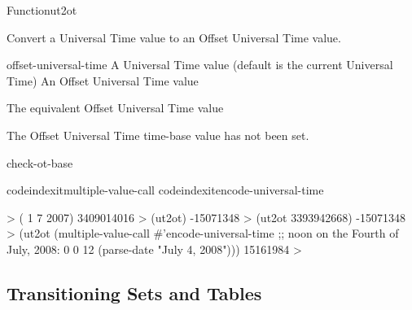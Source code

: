 \documentclass[10pt,twoside,english,pdftex]{article}
\begin{document}

\begin{functiondoc}{Function}{ut2ot}{%
    }
%

\fnsyntax

\fnpurpose Convert a Universal Time value to an Offset Universal Time 
value.

\fnpackage {}

\fnmodule {}

\fnargs
\begin{args}{offset-universal-time}
 A Universal Time value (default is the current
   Universal Time)
 An Offset Universal Time value
\end{args}

\fnreturns The equivalent Offset Universal Time value

\fnerrors The Offset Universal Time time-base value has not been set.

\begin{alsos}{check-ot-base}
\also[*ot-base*]
\also[ot2ut]
\end{alsos}

\fnexamples
%
codeindexit{multiple-value-call}%
codeindexit{encode-universal-time}%
%
\W\supp
\begin{example}
  > ( 1 7 2007)
  3409014016
  > (ut2ot)
  -15071348
  > (ut2ot 3393942668)
  -15071348
  > (ut2ot (multiple-value-call #'encode-universal-time 
             ;; noon on the Fourth of July, 2008:
             0 0 12 (parse-date "July 4, 2008")))
  15161984
  >
\end{example}

\end{functiondoc}


\T\markright{}%
\T\pagestyle{plain}
\T\clearpage
\W{}
\T\pagestyle{fancy}
\T\thispagestyle{fancybottom}
\T\global\def\fnlastname{ }%

\subsection{Transitioning Sets and Tables}
\label{sec:atable}%
\end{document}
